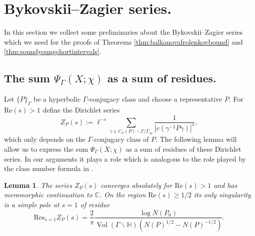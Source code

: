 \documentclass{article}
\newtheorem{lem}[thm]{Lemma}
\theoremstyle{named}
\newcommand{\CC}{\mathbb{C}}
\newcommand{\Hyp}{\mathbb{H}}
\DeclareMathOperator{\vol}{Vol}
\begin{document}
\section{Bykovskii--Zagier series.}\label{sec:bykovskiizagierseries}
In this section we collect some preliminaries about the Bykovskii--Zagier series which we need for the proofs of Theorems \ref{thm:balkanovafrolenkovbound} and \ref{thm:soundyoungshortintervals}. 

\subsection{The sum $\Psi_\Gamma(X; \chi)$ as a sum of residues.}
Let $\{P\}_\Gamma$ be a hyperbolic $\Gamma$-conjugacy class and choose a representative $P$. For $\text{Re}(s) > 1$ define the Dirichlet series 
\begin{equation*}
    Z_P(s) := \ell^{-s}\sum_{\gamma \in C_\Gamma(P)\backslash \Gamma/\Gamma_\infty} \frac{1}{|c(\gamma^{-1}P\gamma)|^s},
\end{equation*}
which only depends on the $\Gamma$-conjugacy class of $P$. The following lemma will allow us to express the sum $\Psi_\Gamma(X; \chi)$ as a sum of residues of these Dirichlet series. In our arguments it plays a role which is analogous to the role played by the class number formula in \cite{Soundararajan_2013}. 
\begin{lem}\label{lem:hyperboliczetafunction}
The series $Z_P(s)$ converges absolutely for $\text{Re}(s) > 1$ and has meromorphic continuation to $\CC$. On the region $\text{Re}(s) \geq 1/2$ its only singularity is a simple pole at $s = 1$ of residue
\begin{equation}\label{eq:residuezetafunction}
    \text{Res}_{s = 1} Z_P(s) = \frac{2}{\pi}\frac{\log N(P_0)}{\vol(\Gamma\backslash \Hyp)(N(P)^{1/2}- N(P)^{-1/2})}.
\end{equation}
\end{lem}
\end{document}
